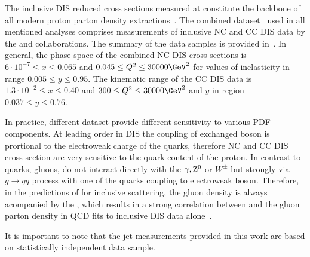 The inclusive DIS reduced cross sections measured at \hera constitute the backbone of all modern proton parton density extractions~\cite{Lai:2010vv,Martin:2009iq,Alekhin:2012ig,Ball:2011uy,Aaron:2009aa}. The combined dataset~\cite{Aaron:2009aa} used in all mentioned analyses comprises measurements of inclusive NC and CC DIS data by the \hone and \zeus collaborations. The summary of the data samples is provided in~\cite{Aaron:2009aa}. In general, the phase space of the combined NC DIS cross sections is $6\cdot 10^{-7} \le x \le 0.065$ and $0.045 \le \qsq \le 30000 \GeV^2$ for values of inelasticity in range $0.005 \le y \le 0.95$. The kinematic range of the CC DIS data is $1.3\cdot 10^{-2} \le x \le 0.40$ and $300 \le \qsq \le 30000 \GeV^2$ and $y$ in region $0.037 \le y \le 0.76$.

In practice, different dataset provide different sensitivity to various PDF components. At leading order in DIS the coupling of exchanged boson is prortional to the electroweak charge of the quarks, therefore NC and CC DIS cross section are very sensitive to the quark content of the proton. In contrast to quarks, gluons, do not interact directly with the $\gamma,\mbox{$\rm{Z}^0$}$ or $W^{\pm}$ but strongly via $g\rightarrow q\bar q$ process with one of the quarks coupling to electroweak boson. Therefore, in the predictions of for inclusive \ep scattering, the gluon density is always acompanied by the \as, which results in a strong correlation between \as and the gluon parton density in QCD fits to inclusive DIS data alone~\cite{}.

It is important to note that the jet measurements provided in this work are based on statistically independent data sample.